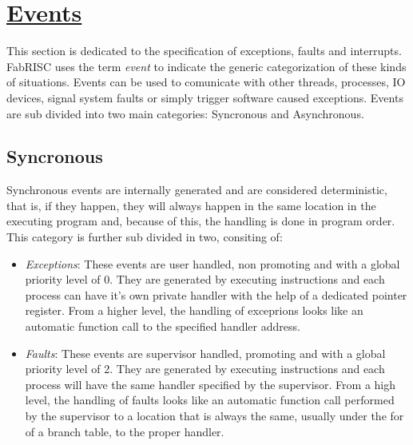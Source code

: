 \documentclass{article}
\begin{document}
    \clearpage

    \section[Events]{\LARGE\underline{Events}}

        This section is dedicated to the specification of exceptions, faults and interrupts. FabRISC uses the term \textit{event} to indicate the generic categorization of these kinds of situations. Events can be used to comunicate with other threads, processes, IO devices, signal system faults or simply trigger software caused exceptions. Events are sub divided into two main categories: Syncronous and Asynchronous.

        \subsection{Syncronous}

            Synchronous events are internally generated and are considered deterministic, that is, if they happen, they will always happen in the same location in the executing program and, because of this, the handling is done in program order. This category is further sub divided in two, consiting of:

            \begin{itemize}

                \item \textit{Exceptions}: These events are user handled, non promoting and with a global priority level of 0. They are generated by executing instructions and each process can have it's own private handler with the help of a dedicated pointer register. From a higher level, the handling of exceprions looks like an automatic function call to the specified handler address.
                \item \textit{Faults}: These events are supervisor handled, promoting and with a global priority level of 2. They are generated by executing instructions and each process will have the same handler specified by the supervisor. From a high level, the handling of faults looks like an automatic function call performed by the supervisor to a location that is always the same, usually under the for of a branch table, to the proper handler.

            \end{itemize}
\end{document}
